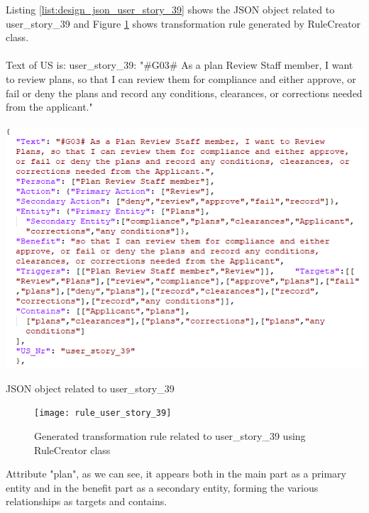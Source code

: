 \begin{example}
	Listing \ref{list:design_json_user_story_39} shows the JSON object related to user\_story\_39 and Figure \ref{fig:design_rule_user_story_39} shows transformation rule generated by RuleCreator class.\\\\
	Text of US is:
	user\_story\_39: "\#G03\# As a plan Review Staff member, I want to review plans, so that I can review them for compliance and either approve, or fail or deny the plans and record any conditions, clearances, or corrections needed from the applicant."
	\begin{MyListing}
		\paragraph{}
		\centering
		\includegraphics[scale=0.8]{Listing/json_user_story_39.png}
		\caption{JSON object related to user\_story\_39}\label{list:design_json_user_story_39}
	\end{MyListing}
	\begin{figure}[h]
		\centering
		\texttt{[image: rule\_user\_story\_39]}
		\caption{Generated transformation rule related to user\_story\_39 using RuleCreator class}\label{fig:design_rule_user_story_39}
	\end{figure}
	Attribute "plan", as we can see, it appears both in the main part as a primary entity and in the benefit part as a secondary entity, forming the various relationships as targets and contains.
\end{example}
